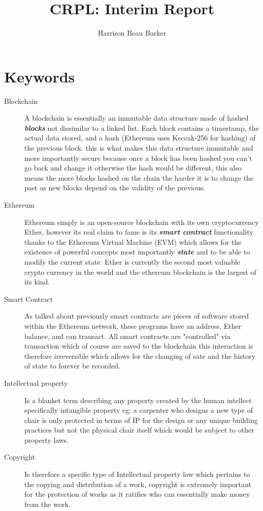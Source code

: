 \documentclass[12pt]{report}
\title{CRPL: Interim Report}
\author{Harrison Beau Barker}
\newcommand{\keyword}[1]{\textbf{\textit{#1}}}
\begin{document}
\maketitle
{}

\tableofcontents{}

\chapter{Keywords}

\begin{description}
  \item[Blockchain] A blockchain is essentially an immutable data structure made of hashed \keyword{blocks} not dissimilar to a linked list. Each block contains a timestamp, the actual data stored, and a hash (Ethereum uses Keccak-256 for hashing) of the previous block. this is what makes this data structure immutable and more importantly secure because once a block has been hashed you can't go back and change it otherwise the hash would be different, this also means the more blocks hashed on the chain the harder it is to change the past as new blocks depend on the validity of the previous.
  \item[Ethereum] Ethereum simply is an open-source blockchain with its own cryptocurrency Ether, however its real claim to fame is its \keyword{smart contract} functionality thanks to the Ethereum Virtual Machine (EVM) which allows for the existence of powerful concepts most importantly \keyword{state} and to be able to modify the current state. Ether is currently the second most valuable crypto currency in the world and the ethereum blockchain is the largest of its kind.
  \item[Smart Contract] As talked about previously smart contracts are pieces of software stored within the Ethereum network, these programs have an address, Ether balance, and can transact. All smart contracts are "controlled" via transaction which of course are saved to the blockchain this interaction is therefore irreversible which allows for the changing of sate and the history of state to forever be recorded.
  \item[Intellectual property] Is a blanket term describing any property created by the human intellect specifically intangible property eg; a carpenter who designs a new type of chair is only protected in terms of IP for the design or any unique building practices but not the physical chair itself which would be subject to other property laws.
  \item[Copyright] Is therefore a specific type of Intellectual property law which pertains to the copying and distribution of a work, copyright is extremely important for the protection of works as it ratifies who can essentially make money from the work.
\end{description}
\end{document}
